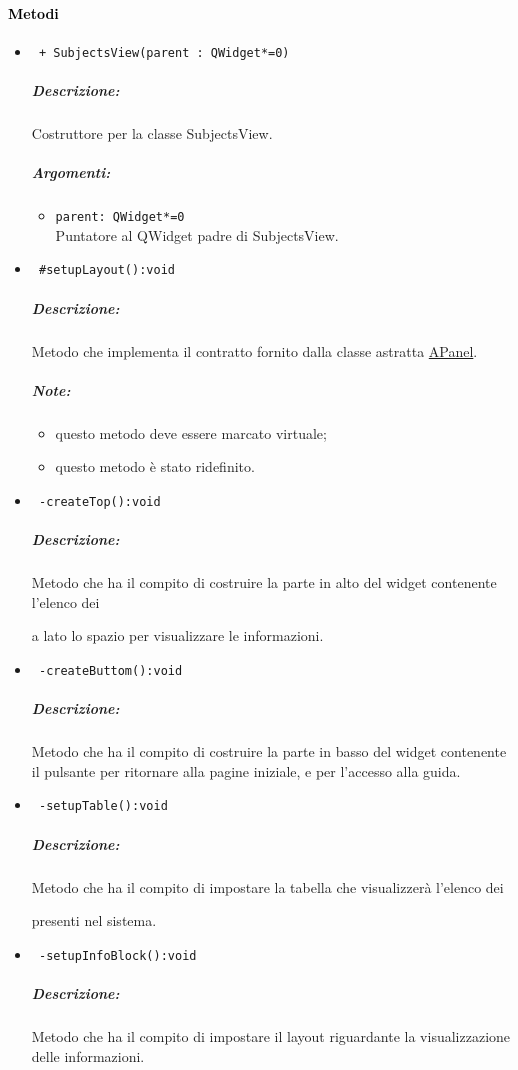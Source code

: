\paragraph{\textcolor{black}{Metodi\\}}
\begin{itemize}
\item\color{blue}\verb! + SubjectsView(parent : QWidget*=0)!
\color{black}
\subparagraph{Descrizione: }Costruttore per la classe SubjectsView. 
\subparagraph{Argomenti:}
\begin{itemize}
\item \color{RoyalPurple}\verb!parent: QWidget*=0 ! \\ Puntatore al QWidget padre di SubjectsView.
\end{itemize}

\item\color{blue}\verb! #setupLayout():void!
\color{black} 
\subparagraph{Descrizione: }Metodo che implementa il contratto fornito dalla classe astratta \hyperref[speAPanel]{APanel}.
\subparagraph{Note: }
\begin{itemize}
\item questo metodo deve essere marcato virtuale;
\item questo metodo è stato ridefinito.
\end{itemize}
 
\item\color{blue}\verb! -createTop():void!
\color{black} 
\subparagraph{Descrizione: }Metodo che ha il compito di costruire la parte in alto del widget contenente l'elenco dei \subject e a lato lo spazio per visualizzare le informazioni.
 
\item\color{blue}\verb! -createButtom():void!
\color{black}
\subparagraph{Descrizione: } Metodo che ha il compito di costruire la parte in basso del widget contenente il pulsante per ritornare alla pagine iniziale, e per l'accesso alla guida.

\item\color{blue}\verb! -setupTable():void!
\color{black}
\subparagraph{Descrizione: } Metodo che ha il compito di impostare la tabella che visualizzerà l'elenco dei \subject{} presenti nel sistema.

\item\color{blue}\verb! -setupInfoBlock():void!
\color{black}
\subparagraph{Descrizione: } Metodo che ha il compito di impostare il layout riguardante la visualizzazione delle informazioni.


\end{itemize}

